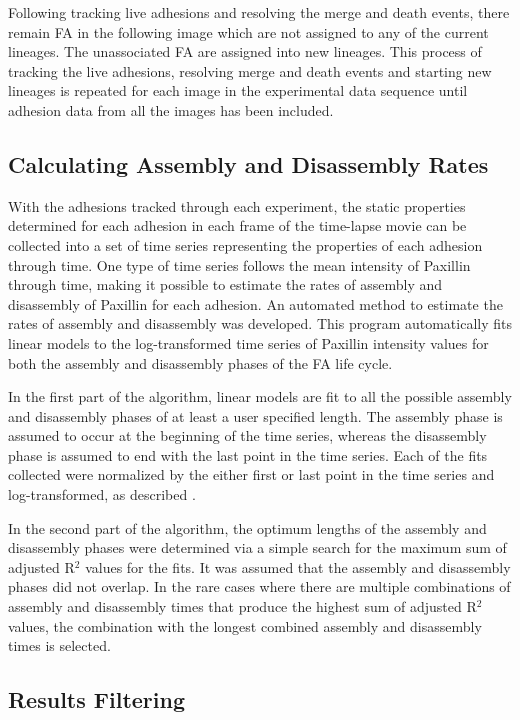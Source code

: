 \documentclass[10pt]{article}
\begin{document}
Following tracking live adhesions and resolving the merge and death events,
there remain FA in the following image which are not assigned to any of the
current lineages. The unassociated FA are assigned into new lineages. This
process of tracking the live adhesions, resolving merge and death events and
starting new lineages is repeated for each image in the experimental data
sequence until adhesion data from all the images has been included.

\subsection*{Calculating Assembly and Disassembly Rates}

With the adhesions tracked through each experiment, the static properties
determined for each adhesion in each frame of the time-lapse movie can be
collected into a set of time series representing the properties of each adhesion
through time. One type of time series follows the mean intensity of Paxillin
through time, making it possible to estimate the rates of assembly and
disassembly of Paxillin for each adhesion. An automated method to estimate the
rates of assembly and disassembly was developed. This program automatically fits
linear models to the log-transformed time series of Paxillin intensity values
for both the assembly and disassembly phases of the FA life cycle. 

In the first part of the algorithm, linear models are fit to all the possible
assembly and disassembly phases of at least a user specified length. The
assembly phase is assumed to occur at the beginning of the time series, whereas
the disassembly phase is assumed to end with the last point in the time series.
Each of the fits collected were normalized by the either first or last point in
the time series and log-transformed, as described \cite{Webb2004}.

In the second part of the algorithm, the optimum lengths of the assembly and
disassembly phases were determined via a simple search for the maximum sum of
adjusted R$^2$ values for the fits. It was assumed that the assembly and
disassembly phases did not overlap. In the rare cases where there are multiple
combinations of assembly and disassembly times that produce the highest sum of
adjusted R$^2$ values, the combination with the longest combined assembly and
disassembly times is selected.

\subsection*{Results Filtering}
\end{document}
